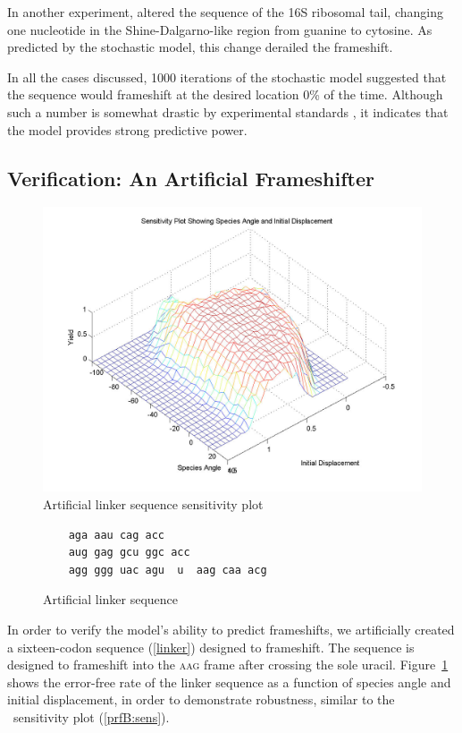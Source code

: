 \documentclass[12pt]{article}
\numberwithin{equation}{section}
\begin{document}
In another experiment, \citeauthor{weiss88} altered the sequence of the
16S ribosomal tail, changing one nucleotide in the Shine-Dalgarno-like region
from guanine to cytosine.  As predicted by the stochastic model, this
change derailed the frameshift.

In all the cases discussed, 1000 iterations of the stochastic model
suggested that the sequence would frameshift at the desired location 0\%
of the time.  Although such a number is somewhat drastic by experimental
standards \cite{weiss87,weiss88}, it indicates that the model provides
strong predictive power.

\subsection{Verification: An Artificial Frameshifter}

\begin{figure}
  \centering
  \caption{Artificial linker sequence sensitivity plot}
  \label{linker:sens}
  \includegraphics[scale=0.25]{linker/sensitivity}
\end{figure}

\begin{figure}
  \caption{Artificial linker sequence}
  \label{linker}
  \begin{verbatim}
    aga aau cag acc
    aug gag gcu ggc acc
    agg ggg uac agu  u  aag caa acg
  \end{verbatim}
\end{figure}

In order to verify the model's ability to predict frameshifts, we
artificially created a sixteen-codon sequence (\autoref{linker})
designed to frameshift.  The sequence is designed to frameshift into
the \textsc{aag} frame after crossing the sole uracil.  Figure~\ref{linker:sens}
shows the error-free rate of the linker sequence as a function of species
angle and initial displacement, in order to demonstrate robustness,
similar to the \prfB\ sensitivity plot (\autoref{prfB:sens}).
\end{document}
